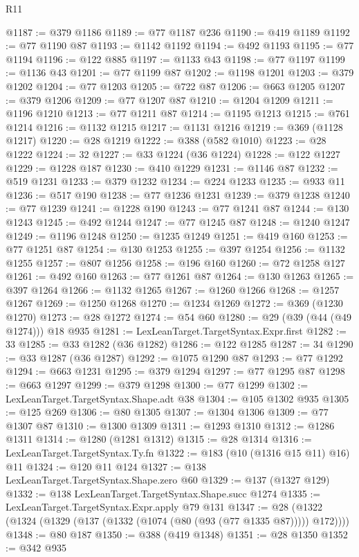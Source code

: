 \begin{lexlean}{R11}
\begin{coremodule}
@1187 := @379 @1186
@1189 := @77 @1187 @236
@1190 := @419 @1189
@1192 := @77 @1190 @87
@1193 := @1142 @1192
@1194 := @492 @1193
@1195 := @77 @1194
@1196 := @122 @885
@1197 := @1133 @43
@1198 := @77 @1197
@1199 := @1136 @43
@1201 := @77 @1199 @87
@1202 := @1198 @1201
@1203 := @379 @1202
@1204 := @77 @1203
@1205 := @722 @87
@1206 := @663 @1205
@1207 := @379 @1206
@1209 := @77 @1207 @87
@1210 := @1204 @1209
@1211 := @1196 @1210
@1213 := @77 @1211 @87
@1214 := @1195 @1213
@1215 := @761 @1214
@1216 := @1132 @1215
@1217 := @1131 @1216
@1219 := @369 (@1128 @1217)
@1220 := @28 @1219
@1222 := @388 (@582 @1010)
@1223 := @28 @1222
@1224 := 32
@1227 := @33 @1224 (@36 @1224)
@1228 := @122 @1227
@1229 := @1228 @187
@1230 := @410 @1229
@1231 := @1146 @87
@1232 := @519 @1231
@1233 := @379 @1232
@1234 := @224 @1233
@1235 := @933 @11
@1236 := @517 @190
@1238 := @77 @1236 @1231
@1239 := @379 @1238
@1240 := @77 @1239
@1241 := @1228 @190
@1243 := @77 @1241 @87
@1244 := @130 @1243
@1245 := @492 @1244
@1247 := @77 @1245 @87
@1248 := @1240 @1247
@1249 := @1196 @1248
@1250 := @1235 @1249
@1251 := @419 @160
@1253 := @77 @1251 @87
@1254 := @130 @1253
@1255 := @397 @1254
@1256 := @1132 @1255
@1257 := @807 @1256
@1258 := @196 @160
@1260 := @72 @1258 @127
@1261 := @492 @160
@1263 := @77 @1261 @87
@1264 := @130 @1263
@1265 := @397 @1264
@1266 := @1132 @1265
@1267 := @1260 @1266
@1268 := @1257 @1267
@1269 := @1250 @1268
@1270 := @1234 @1269
@1272 := @369 (@1230 @1270)
@1273 := @28 @1272
@1274 := @54 @60
@1280 := @29 (@39 (@44 (@49 @1274))) @18 @935
@1281 := LexLeanTarget.TargetSyntax.Expr.first
@1282 := 33
@1285 := @33 @1282 (@36 @1282)
@1286 := @122 @1285
@1287 := 34
@1290 := @33 @1287 (@36 @1287)
@1292 := @1075 @1290 @87
@1293 := @77 @1292
@1294 := @663 @1231
@1295 := @379 @1294
@1297 := @77 @1295 @87
@1298 := @663 @1297
@1299 := @379 @1298
@1300 := @77 @1299
@1302 := LexLeanTarget.TargetSyntax.Shape.adt @38
@1304 := @105 @1302 @935
@1305 := @125 @269
@1306 := @80 @1305
@1307 := @1304 @1306
@1309 := @77 @1307 @87
@1310 := @1300 @1309
@1311 := @1293 @1310
@1312 := @1286 @1311
@1314 := @1280 (@1281 @1312)
@1315 := @28 @1314
@1316 := LexLeanTarget.TargetSyntax.Ty.fn
@1322 := @183 (@10 (@1316 @15 @11) @16) @11
@1324 := @120 @11 @124
@1327 := @138 LexLeanTarget.TargetSyntax.Shape.zero @60
@1329 := @137 (@1327 @129)
@1332 := @138 LexLeanTarget.TargetSyntax.Shape.succ @1274
@1335 := LexLeanTarget.TargetSyntax.Expr.apply @79 @131
@1347 := @28 (@1322 (@1324 (@1329 (@137 (@1332 (@1074 (@80 (@93 (@77 @1335 @87))))) @172))))
@1348 := @80 @187
@1350 := @388 (@419 @1348)
@1351 := @28 @1350
@1352 := @342 @935

\end{coremodule}
\end{lexlean}
